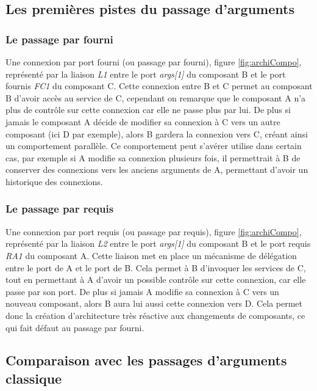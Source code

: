   \subsection{Les premières pistes du passage d'arguments}
  
      \subsubsection{Le passage par fourni}
      
      Une connexion par port fourni (ou passage par fourni), figure \ref{fig:archiCompo}, représenté par la liaison \emph{L1} entre le port \emph{args[1]} du composant B et le port fournis \emph{FC1} du composant C. Cette connexion entre B et C permet au composant B d'avoir accès au service de C, cependant on remarque que le composant A n'a plus de contrôle sur cette connexion car elle ne passe plus par lui. De plus si jamais le composant A décide de modifier sa connexion à C vers un autre composant (ici D par exemple), alors B gardera la connexion vers C, créant ainsi un comportement parallèle. Ce comportement peut s'avérer utilise dans certain cas, par exemple si A modifie sa connexion plusieurs fois, il permettrait à B de conserver des connexions vers les anciens arguments de A, permettant d'avoir un historique des connexions. 
      
      \subsubsection{Le passage par requis}
      
      Une connexion par port requis (ou passage par requis), figure \ref{fig:archiCompo}, représenté par la liaison \emph{L2} entre le port \emph{args[1]} du composant B et le port requis \emph{RA1} du composant A. Cette liaison met en place un mécanisme de délégation entre le port de A et le port de B. Cela permet à B d'invoquer les services de C, tout en permettant à A d'avoir un possible contrôle sur cette connexion, car elle passe par son port. De plus si jamais A modifie sa connexion à C vers un nouveau composant, alors B aura lui aussi cette connexion vers D. Cela permet donc la création d'architecture très réactive aux changements de composants, ce qui fait défaut au passage par fourni. 
      
  \subsection{Comparaison avec les passages d'arguments classique}
  
